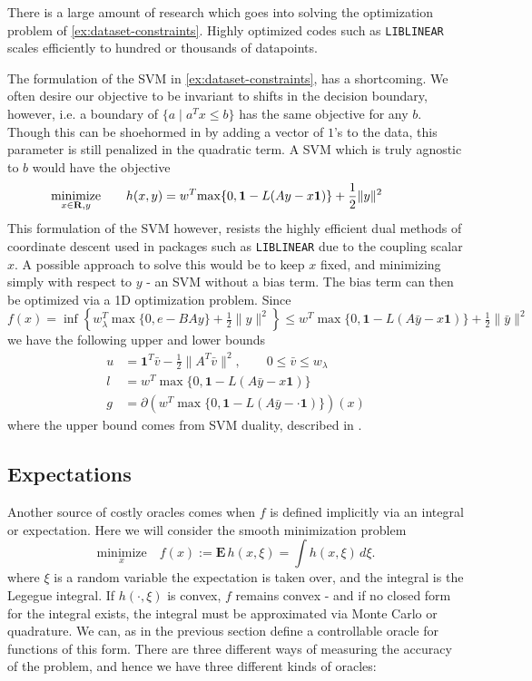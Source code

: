 \begin{example} There is a large amount of research
which goes into solving the optimization problem of \eqref{ex:dataset-constraints}.
Highly optimized codes such as {\tt LIBLINEAR} \cite{REF08a} scales efficiently to hundred or thousands of
datapoints. 

The formulation of the SVM in  \eqref{ex:dataset-constraints}, has a shortcoming.
We often desire our objective to be invariant to shifts in the
decision boundary, however, i.e. a boundary of $\{ a \mid a^Tx \leq b \}$ has the same
objective for any $b$. Though this can be shoehormed in by adding a vector of $1$'s to the data, 
this parameter is still penalized in the quadratic term. A SVM which is truly agnostic
to $b$ would have the objective
$$
\underset{x\in \mathbf{R} ,y}{\mbox{minimize}}\qquad h(x,y) = w^{T}\!\max\{0,\mathbf{1}-L(Ay - x\mathbf{1})\}+\frac{1}{2}\|y\|^{2}
\qquad \quad$$
This formulation of the SVM however, resists the highly efficient dual methods
of coordinate descent used in packages such as {\tt LIBLINEAR} \cite{REF08a}
due to the coupling scalar $x$. A possible approach to solve this
would be to keep $x$ fixed, and minimizing simply with respect to $y$ - an SVM
without a bias term. The bias term can then be optimized via a 1D optimization
problem. Since
$$
f(x)=\inf\left\{ w_{\lambda}^{T}\max\{0,e-BAy\}+\tfrac{1}{2}\|y\|^{2}\right\} \leq w^{T}\!\max\{0,\mathbf{1}-L(A\bar{y}-x\mathbf{1})\}+\tfrac{1}{2}\|\bar{y}\|^{2}
$$
we have the following upper and lower bounds
\begin{align*}
u & =\mathbf{1}^{T}\bar{v}-\tfrac{1}{2}\|A^{T}\bar{v}\|^{2},\qquad0\leq\bar{{v}}\leq w_{\lambda}\\
l & =w^{T}\!\max\{0,\mathbf{1}-L(A\bar{y}-x\mathbf{1})\}\\
g & =\partial(w^{T}\!\max\{0,\mathbf{1}-L(A\bar{y}-\cdot\mathbf{1})\})(x)
\end{align*}
where the upper bound comes from SVM duality, described in .

\end{example}
 

\subsection{Expectations}
Another source of costly oracles comes when $f$ is defined
implicitly via an integral or expectation. Here we will consider the smooth 
minimization problem
$$
\underset{x}{\mbox{minimize}}\quad f(x) :=\mathbf{E}\,h(x,\xi) = \int \! h(x,\xi) \,d\xi .
$$
where $\xi$ is a random variable the expectation is taken over, and the
integral is the Legegue integral. If $h(\cdot, \xi)$ is convex, $f$ remains
convex - and if no closed form for the integral exists, the integral must be
approximated via Monte Carlo or quadrature. We can, as in the previous section
define  a controllable oracle for functions of this form. There are three
different ways of measuring the accuracy of the problem, and hence we have
three different kinds of oracles:

